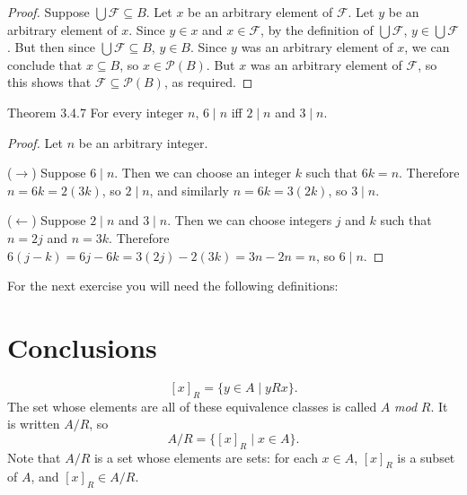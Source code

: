 \documentclass[
  letterpaper,
]{scrreprt}
\newenvironment{mdsk}
	{\medskip}
	{}
\newcommand{\excl}[1]{}
\theoremstyle{remark}
\begin{document}
\begin{proof}

Suppose \(\bigcup \mathcal{F} \subseteq B\). Let \(x\) be an arbitrary
element of \(\mathcal{F}\). Let \(y\) be an arbitrary element of \(x\).
Since \(y \in x\) and \(x \in \mathcal{F}\), by the definition of
\(\bigcup \mathcal{F}\), \(y \in \bigcup \mathcal{F}\). But then since
\(\bigcup \mathcal{F} \subseteq B\), \(y \in B\). Since \(y\) was an
arbitrary element of \(x\), we can conclude that \(x \subseteq B\), so
\(x \in \mathscr{P}(B)\). But \(x\) was an arbitrary element of
\(\mathcal{F}\), so this shows that
\(\mathcal{F} \subseteq \mathscr{P}(B)\), as required. \excl{~□}\qedhere

\end{proof}

\begin{nthm}{Theorem 3.4.7}
For every integer \(n\), \(6 \mid n\) iff \(2 \mid n\) and \(3 \mid n\).

\end{nthm}

\begin{proof}

Let \(n\) be an arbitrary integer.

(\(\to\)) Suppose \(6 \mid n\). Then we can choose an integer \(k\) such
that \(6k=n\). Therefore \(n = 6k = 2(3k)\), so \(2 \mid n\), and
similarly \(n = 6k = 3(2k)\), so \(3 \mid n\).

(\(\leftarrow\)) Suppose \(2 \mid n\) and \(3 \mid n\). Then we can
choose integers \(j\) and \(k\) such that \(n = 2j\) and \(n = 3k\).
Therefore \(6(j-k) = 6j - 6k = 3(2j) - 2(3k) = 3n - 2n = n\), so
\(6 \mid n\). \excl{~□}\qedhere

\end{proof}

\begin{mdsk}

\end{mdsk}

For the next exercise you will need the following definitions:


\hypertarget{conclusions}{%
\chapter{Conclusions}\label{conclusions}}

\[
[x]_R = \{y \in A \mid yRx\}.
\] The set whose elements are all of these equivalence classes is called
\(A\) \emph{mod} \(R\). It is written \(A/R\), so \[
A/R = \{[x]_R \mid x \in A\}.
\] Note that \(A/R\) is a set whose elements are sets: for each
\(x \in A\), \([x]_R\) is a subset of \(A\), and \([x]_R \in A/R\).
\end{document}
